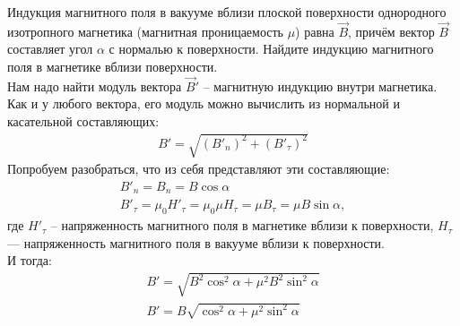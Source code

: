\documentclass[__main__.tex]{subfiles}
\begin{document}
Индукция магнитного поля в вакууме вблизи плоской поверхности однородного изотропного магнетика (магнитная проницаемость $\mu$) равна $\vec{B}$, причём вектор $\vec{B}$ составляет угол $\alpha$ с нормалью к поверхности. Найдите индукцию магнитного поля в магнетике вблизи поверхности.\\ 

Нам надо найти модуль вектора $\vec{B}'$ -- магнитную индукцию внутри магнетика. Как и у любого вектора, его модуль можно вычислить из нормальной и касательной составляющих:
\begin{gather*}
B'=\sqrt{(B'_n)^2+(B'_\tau)^2}
\end{gather*}
Попробуем разобраться, что из себя представляют эти составляющие:
\begin{gather*}
B'_n=B_n=B\cos\alpha \\
B'_\tau=\mu_0H'_\tau=\mu_0\mu H_\tau=\mu B_\tau=\mu B\sin\alpha, 
\end{gather*}
где $H'_\tau$ -- напряженность магнитного поля в магнетике вблизи к поверхности, $H_\tau$ --- напряженность магнитного поля в вакууме вблизи к поверхности.\\
И тогда:
\begin{gather*}
B'=\sqrt{B^2\cos^2\alpha+\mu^2B^2\sin^2\alpha}\\
B'=B\sqrt{\cos^2\alpha+\mu^2\sin^2\alpha}
\end{gather*}
\end{document}
